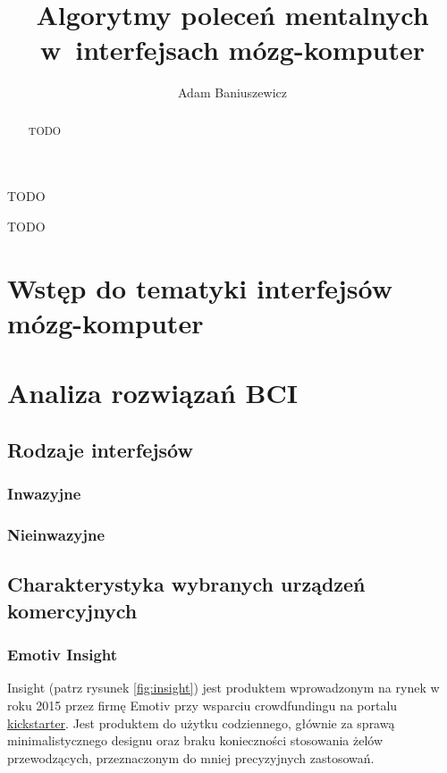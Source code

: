 \documentclass[skorowidz,skroty]{dyplomWEZUT}
\author{Adam Baniuszewicz}
\title{Algorytmy poleceń mentalnych w~interfejsach mózg-komputer}
\begin{document}
\begin{streszczenie}
TODO
\end{streszczenie}

\begin{abstract}
TODO
\end{abstract}

\maketitle

\begin{wprowadzenie}

TODO

\end{wprowadzenie}



\chapter{Wstęp do tematyki interfejsów mózg-komputer}

\chapter{Analiza rozwiązań BCI}
\section{Rodzaje interfejsów}
\subsection{Inwazyjne}
\subsection{Nieinwazyjne}
\section{Charakterystyka wybranych urządzeń komercyjnych}
\subsection{Emotiv Insight\label{subsection:insight}}
Insight (patrz rysunek \vref{fig:insight}) jest produktem wprowadzonym na rynek w roku 2015 przez firmę Emotiv przy wsparciu crowdfundingu na portalu \href{www.kickstarter.com}{kickstarter}. Jest produktem do użytku codziennego, głównie za sprawą minimalistycznego designu oraz braku konieczności stosowania żelów przewodzących, przeznaczonym do mniej precyzyjnych zastosowań.
\end{document}
